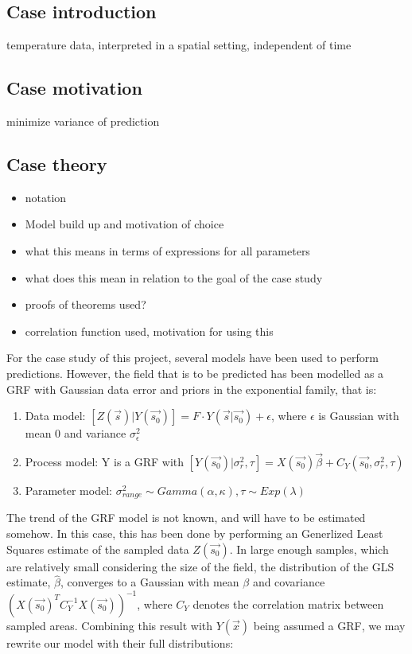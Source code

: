 \subsection{Case introduction}
temperature data, interpreted in a spatial setting, independent of time
\subsection{Case motivation}
minimize variance of prediction
\subsection{Case theory}
\begin{itemize}
\item notation
\item Model build up and motivation of choice
\item what this means in terms of expressions for all parameters
\item what does this mean in relation to the goal of the case study
\item proofs of theorems used?
\item correlation function used, motivation for using this
\end{itemize}
For the case study of this project, several models have been used to perform predictions. However, the field that is to be predicted has been modelled as a GRF with Gaussian data error and priors in the exponential family, that is: \\
\begin{enumerate}
\item Data model: $[Z(\vec{s})|Y(\vec{s_0})] = F \cdot Y(\vec{s} | \vec{s_0}) + \epsilon$, where $\epsilon$ is Gaussian with mean 0 and variance $\sigma_{\epsilon}^2$
\item Process model: Y is a GRF with $[Y(\vec{s_0}) | \sigma_{r}^2, \tau]  = X(\vec{s_0})\vec{\beta} + C_Y(\vec{s_0}, \sigma_{r}^2, \tau)$
\item Parameter model: $\sigma_{range}^2 \sim Gamma(\alpha, \kappa), \tau \sim Exp(\lambda)$ 
\end{enumerate}
The trend of the GRF model is not known, and will have to be estimated somehow. In this case, this has been done by performing an Generlized Least Squares estimate of the sampled data $Z(\vec{s_0})$. In large enough samples, which are relatively small considering the size of the field, the distribution of the GLS estimate, $\hat\beta$, converges to a Gaussian with mean $\beta$ and covariance $(X(\vec{s_0})^{T}C_Y^{-1}X(\vec{s_0}))^{-1}$, where $C_Y$ denotes the correlation matrix between sampled areas. Combining this result with $Y(\vec{x})$ being assumed a GRF, we may rewrite our model with their full distributions:
